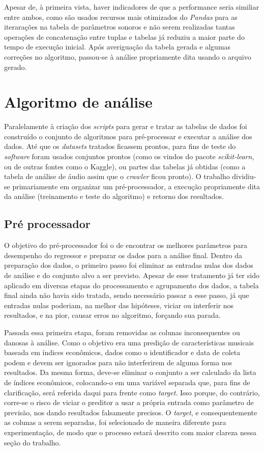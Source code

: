 Apesar de, à primeira vista, haver indicadores de que a performance seria similiar entre ambos, como são usados recursos mais otimizados do \textit{Pandas} para as iterarações na tabela de parâmetros sonoros e não serem realizadas tantas operações de concatenação entre tuplas e tabelas já reduziu a maior parte do tempo de execução inicial. Após averiguação da tabela gerada e algumas correções no algoritmo, passou-se à análise propriamente dita usando o arquivo gerado.

\section{Algoritmo de análise}
\label{c.analise_alg}

Paralelamente à criação dos \textit{scripts} para gerar e tratar as tabelas de dados foi construído o conjunto de algoritmos para pré-processar e executar a análise dos dados. Até que os \textit{datasets} tratados ficassem prontos, para fins de teste do \textit{software} foram usados conjuntos prontos (como os vindos do pacote \textit{scikit-learn}, ou de outras fontes como o Kaggle), ou partes das tabelas já obtidas (como a tabela de análise de áudio assim que o \textit{crawler} ficou pronto). O trabalho dividiu-se primariamente em organizar um pré-processador, a execução propriamente dita da análise (treinamento e teste do algoritmo) e retorno dos resultados.

\subsection{Pré processador}
\label{c.preprocessor}

O objetivo do pré-processador foi o de encontrar os melhores parâmetros para desempenho do regressor e preparar os dados para a análise final. Dentro da preparação dos dados, o primeiro passo foi eliminar as entradas nulas dos dados de análise e do conjunto alvo a ser previsto. Apesar de esse tratamento já ter sido aplicado em diversas etapas do processamento e agrupamento dos dados, a tabela final ainda não havia sido tratada, sendo necessário passar a esse passo, já que entradas nulas poderiam, na melhor das hipóteses, viciar ou interferir nos resultados, e na pior, causar erros no algoritmo, forçando sua parada.

Passada essa primeira etapa, foram removidas as colunas inconsequentes ou danosas à análise. Como o objetivo era uma predição de características musicais baseada em índices econômicos, dados como o identificador e data de coleta podem e devem ser ignorados para não interferirem de alguma forma nos resultados. Da mesma forma, deve-se eliminar o conjunto a ser calculado da lista de índices econômicos, colocando-o em uma variável separada que, para fins de clarificação, será referida daqui para frente como \textit{target}. Isso porque, do contrário, corre-se o risco de viciar o preditor a usar a própria entrada como parâmetro de previsão, nos dando resultados falsamente precisos. O \textit{target}, e consequentemente as colunas a serem separadas, foi selecionado de maneira diferente para experimentação, de modo que o processo estará descrito com maior clareza nessa seção do trabalho.

